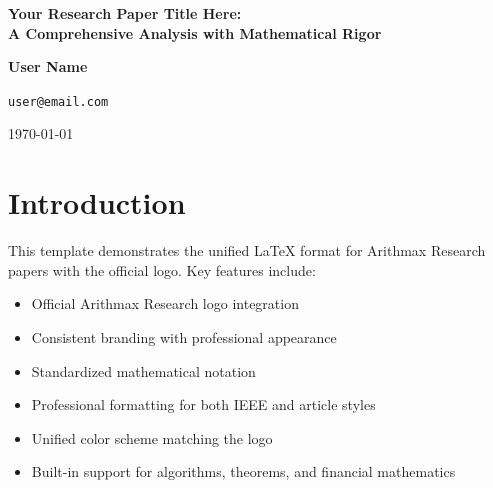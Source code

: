 \documentclass[twocolumn,ieee]{arithmaxresearch}
\begin{document}
\begin{titlepage}
\thispagestyle{empty}
\begin{center}
\vspace*{2.0cm}

{\LARGE\bfseries\color{arithmaxblue}Your Research Paper Title Here: \\
A Comprehensive Analysis with Mathematical Rigor\par}

\vspace{1.5cm}
\arithmaxtitlelogo[4cm]

\vspace{1.5cm}
{\large\textbf{User Name}\par}
\vspace{0.4cm}
{\normalsize\texttt{user@email.com}\par}
\vspace{0.6cm}
{\normalsize\today\par}

\vfill
\end{center}
\end{titlepage}

\setcounter{page}{2}

\begin{abstract}
Your abstract goes here. This template provides consistent formatting, branding, and mathematical notation for all Arithmax Research publications. The abstract should clearly state the problem, methodology, key findings, and contributions.
\end{abstract}

\section{Introduction}

This template demonstrates the unified LaTeX format for Arithmax Research papers with the official logo. Key features include:

\begin{itemize}
    \item Official Arithmax Research logo integration
    \item Consistent branding with professional appearance
    \item Standardized mathematical notation
    \item Professional formatting for both IEEE and article styles
    \item Unified color scheme matching the logo
    \item Built-in support for algorithms, theorems, and financial mathematics
\end{itemize}
\end{document}
